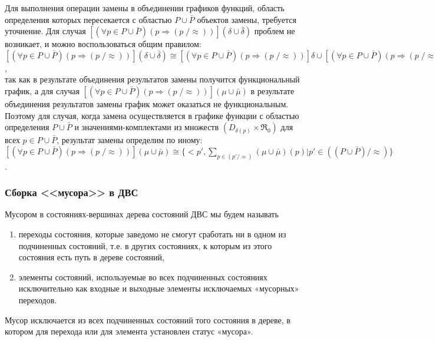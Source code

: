 		Для выполнения операции замены в объединении графиков функций, 
		область определения которых пересекается с областью  $ P\cup\bar{P} $  объектов замены, требуется уточнение. 
		Для случая $ [(\forall p \in P \cup \bar{P} )(p\Rightarrow(p\; / \approx) )](\delta\cup\bar{\delta})$   
		проблем не возникает, и можно воспользоваться общим правилом:\\
		$[(\forall p \in P \cup \bar{P} )(p\Rightarrow(p\; / \approx) )](\delta\cup\bar{\delta}) \cong
		[(\forall p \in P \cup \bar{P} )(p\Rightarrow(p\; / \approx) )] \delta \cup [(\forall p \in P \cup \bar{P} )(p\Rightarrow(p\; / \approx) )]\bar{\delta}$,\\
		так как в результате объединения результатов замены получится функциональный график, 
		а для случая  $ [(\forall p \in P \cup \bar{P} )(p\Rightarrow(p\; / \approx) )](\mu\cup\bar{\mu}) $   
		в результате объединения результатов замены график может оказаться не функциональным. 
		Поэтому для случая, когда замена осуществляется в графике функции с областью определения  $ P\cup\bar{P} $  
		и значениями-комплектами из множеств  $ (D_{\delta(p)}\times\Re_0) $  для всех $ p\in P\cup \bar{P} $, 
		результат замены определим по иному:\\
		$ [(\forall p \in P \cup \bar{P} )(p\Rightarrow(p\; / \approx) )](\mu\cup\bar{\mu})\cong
		\{<p',\!\displaystyle\sum_{p \in (p'/\approx)}\!(\mu\cup\bar{\mu})(p)| p' \in ((P\cup\bar{P}) /\!\approx) \} $.
		
   \subsubsection{Сборка <<мусора>>  в ДВС}
	   Мусором в состояниях-вершинах дерева состояний ДВС мы будем называть 
	   \begin{enumerate}
		   \item переходы состояния, которые заведомо не смогут сработать ни в одном из подчиненных состояний, т.е. в других состояниях, к которым из этого состояния есть путь в дереве состояний,
		   \item элементы состояний, используемые во всех подчиненных состояниях исключительно как входные и выходные элементы исключаемых «мусорных» переходов.
	   \end{enumerate}

	   Мусор исключается из всех подчиненных состояний того состояния в дереве, в котором для перехода или для элемента установлен статус «мусора».
	   
